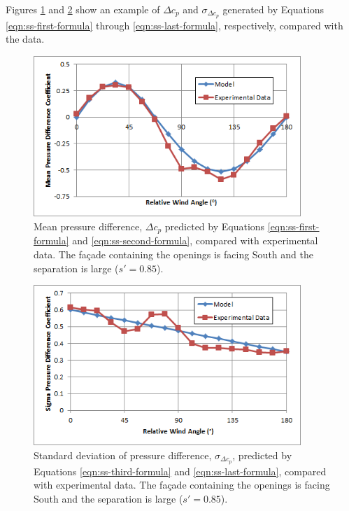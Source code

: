 Figures \ref{fig:ss-figure-2-upper} and \ref{fig:ss-figure-2-lower} show an example of $\Delta c_p$ and $\sigma_{\Delta c_p}$ generated by Equations \ref{eqn:ss-first-formula} through \ref{eqn:ss-last-formula}, respectively, compared with the data.
%
\begin{figure}[hbtp] %
\centering
\includegraphics[width=0.9\textwidth, height=0.9\textheight, keepaspectratio=true]{media/ss-chart1.png}
\caption{Mean pressure difference, $\Delta c_p$ predicted by Equations \ref{eqn:ss-first-formula} and \ref{eqn:ss-second-formula}, compared with experimental data. The fa\c{c}ade containing the openings is facing South and the separation is large ($s' = 0.85$). \protect \label{fig:ss-figure-2-upper}}
\end{figure}
%
\begin{figure}[hbtp] %
\centering
\includegraphics[width=0.9\textwidth, height=0.9\textheight, keepaspectratio=true]{media/ss-chart2.png}
\caption{Standard deviation of pressure difference, $\sigma_{\Delta c_p}$, predicted by Equations \ref{eqn:ss-third-formula} and \ref{eqn:ss-last-formula}, compared with experimental data. The fa\c{c}ade containing the openings is facing South and the separation is large ($s' = 0.85$). \protect \label{fig:ss-figure-2-lower}}
\end{figure}


